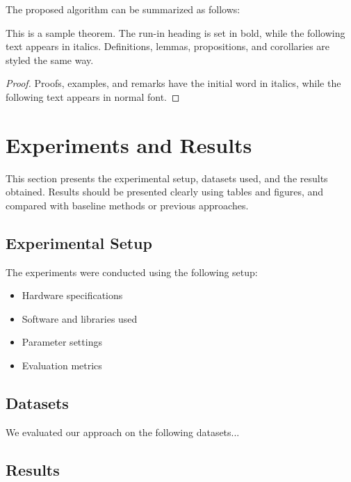\documentclass[runningheads]{llncs}
\begin{document}
The proposed algorithm can be summarized as follows:

\begin{theorem}
This is a sample theorem. The run-in heading is set in bold, while
the following text appears in italics. Definitions, lemmas,
propositions, and corollaries are styled the same way.
\end{theorem}
%
%
\begin{proof}
Proofs, examples, and remarks have the initial word in italics,
while the following text appears in normal font.
\end{proof}

\section{Experiments and Results}

This section presents the experimental setup, datasets used, and the results
obtained. Results should be presented clearly using tables and figures, and
compared with baseline methods or previous approaches.

\subsection{Experimental Setup}

The experiments were conducted using the following setup:
\begin{itemize}
\item Hardware specifications
\item Software and libraries used
\item Parameter settings
\item Evaluation metrics
\end{itemize}

\subsection{Datasets}

We evaluated our approach on the following datasets...

\subsection{Results}
\end{document}
